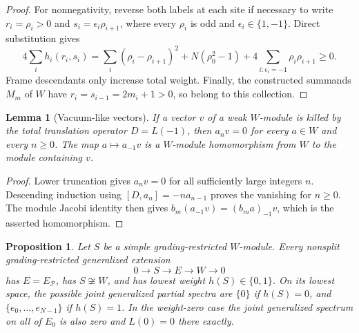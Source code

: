 \documentclass[11pt,a4paper]{article}
\numberwithin{equation}{section}
\newtheorem{proposition}[theorem]{Proposition}
\newtheorem{lemma}[theorem]{Lemma}
\theoremstyle{definition}\newtheorem{definition}[theorem]{Definition}
\theoremstyle{remark}\newtheorem{remark}[theorem]{Remark}
\begin{document}
\begin{proof}
For nonnegativity, reverse both labels at each site if necessary to
write $r_i=\rho_i>0$ and $s_i=\epsilon_i\rho_{i+1}$, where every
$\rho_i$ is odd and $\epsilon_i\in\{1,-1\}$.  Direct substitution gives
\begin{equation}\label{neutral:eq:aligned-positive-weight}
 4\sum_i h_i(r_i,s_i)
 =\sum_i(\rho_i-\rho_{i+1})^2+N(\rho_0^2-1)
       +4\sum_{i:\epsilon_i=-1}\rho_i\rho_{i+1}\geq0.
\end{equation}
Frame descendants only increase total weight.  Finally, the
constructed summands $M_m$ of $W$ have $r_i=s_{i-1}=2m_i+1>0$,
so belong to this collection.
\end{proof}

\begin{lemma}[Vacuum-like vectors]\label{neutral:lem:vacuum-like}
If a vector $v$ of a weak $W$-module is killed by the total translation
operator $D=L(-1)$, then $a_nv=0$ for every $a\in W$ and every
$n\geq0$.  The map $a\mapsto a_{-1}v$ is a $W$-module homomorphism
from $W$ to the module containing $v$.
\end{lemma}

\begin{proof}
Lower truncation gives $a_nv=0$ for all sufficiently large integers
$n$.  Descending induction using $[D,a_n]=-n a_{n-1}$ proves the
vanishing for $n\geq0$.  The module Jacobi identity then gives
$b_m(a_{-1}v)=(b_ma)_{-1}v$, which is the asserted homomorphism.
\end{proof}

\begin{proposition}\label{neutral:prop:two-lowest-weights}
Let $S$ be a simple grading-restricted $W$-module.  Every nonsplit
grading-restricted generalized extension
\[
                0\longrightarrow S\longrightarrow E
                         \longrightarrow W\longrightarrow0
\]
has $E=E_{\mathscr P}$, has $S\not\cong W$, and has lowest weight
$h(S)\in\{0,1\}$.  On its lowest space, the possible joint generalized
partial spectra are $\{0\}$ if $h(S)=0$, and
$\{e_0,\ldots,e_{N-1}\}$ if $h(S)=1$.  In the weight-zero case the
joint generalized spectrum on all of $E_0$ is also zero and $L(0)=0$
there exactly.
\end{proposition}
\end{document}
